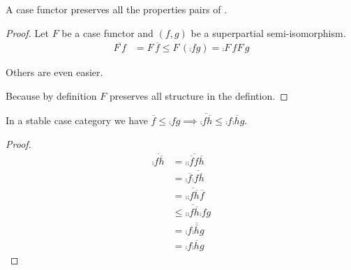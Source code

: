 \documentclass[runningheads,envcountsame]{llncs}
\begin{document}
\begin{lemma}
    A case functor preserves all the properties pairs of .
\end{lemma}
\begin{proof}
    Let $F$ be a case functor and $(f, g)$ be a superpartial semi-isomorphism.
    \begin{align}
        \overline{F\,f} & = F\,\overline{f} \leq F\,(\comp{f}{g}) = \comp{F\,f}{F\,g}
    \end{align}
    
    Others are even easier.
    
    Because by definition $F$ preserves all structure in the defintion.
\end{proof}

\begin{lemma} \label{lem:semiiso-insert}
    In a stable case category we have $\overline{f} \leq \comp{f}{g} \implies \overline{\comp{f}{\overline{h}}} \leq \comp{f}{\comp{\overline{h}}{g}}$.
\end{lemma}
\begin{proof}
    \begin{align}
        \overline{\comp{f}{\overline{h}}} & = \overline{\comp{\comp{\overline{f}}{f}}{\overline{h}}} \\
            & = \comp{\overline{f}}{\overline{\comp{f}{\overline{h}}}} \\
            & = \comp{\overline{\comp{f}{\overline{h}}}}{\overline{f}} \\
            & \leq \comp{\overline{\comp{f}{\overline{h}}}}{\comp{f}{g}} \\
            & = \comp{f}{\comp{\overline{\overline{h}}}{g}} \\
            & = \comp{f}{\comp{\overline{h}}{g}} 
    \end{align}
\end{proof}
\end{document}
